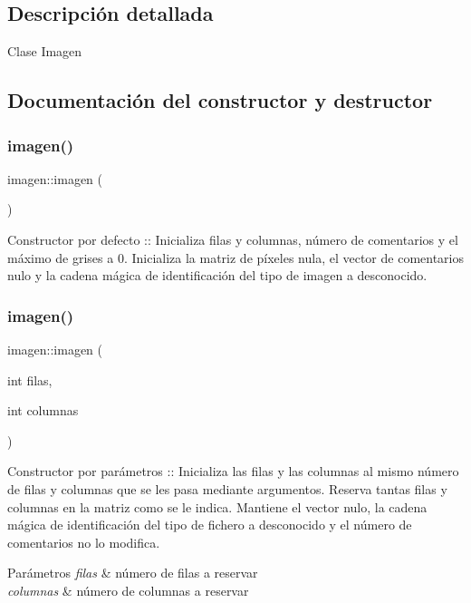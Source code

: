 \subsection{Descripción detallada}
Clase Imagen 

\subsection{Documentación del constructor y destructor}
\mbox{\label{classimagen_a3a8a8d82546e8fc325c385e2dc4b00e6}} 
\subsubsection{\texorpdfstring{imagen()}{imagen()}\hspace{0.1cm}{\footnotesize\ttfamily [1/4]}}
{\footnotesize\ttfamily imagen\+::imagen (\begin{DoxyParamCaption}{ }\end{DoxyParamCaption})}

Constructor por defecto \+:\+: Inicializa filas y columnas, número de comentarios y el máximo de grises a 0. Inicializa la matriz de píxeles nula, el vector de comentarios nulo y la cadena mágica de identificación del tipo de imagen a desconocido. \mbox{\label{classimagen_aeec0ca5171e8a1eac8c20c31e74d538d}} 
\subsubsection{\texorpdfstring{imagen()}{imagen()}\hspace{0.1cm}{\footnotesize\ttfamily [2/4]}}
{\footnotesize\ttfamily imagen\+::imagen (\begin{DoxyParamCaption}\item[{int}]{filas,  }\item[{int}]{columnas }\end{DoxyParamCaption})}

Constructor por parámetros \+:\+: Inicializa las filas y las columnas al mismo número de filas y columnas que se les pasa mediante argumentos. Reserva tantas filas y columnas en la matriz como se le indica. Mantiene el vector nulo, la cadena mágica de identificación del tipo de fichero a desconocido y el número de comentarios no lo modifica. 
\begin{DoxyParams}{Parámetros}
{\em filas} & número de filas a reservar \\
\hline
{\em columnas} & número de columnas a reservar \\
\hline
\end{DoxyParams}
\mbox{\label{classimagen_a4e891c5bfbe09261dc02660879e37bea}} 
